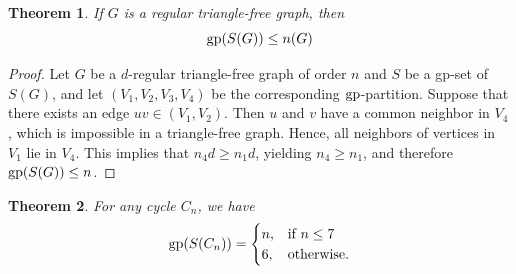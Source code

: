 \documentclass[a4paper,12pt]{article}
\newtheorem{theorem}{Theorem}[section]
\newcommand{\gp}{{\rm gp}}
\newcommand{\igp}{{\rm igp}}
\begin{document}
{%
\begin{theorem}\label{thm:regular bound}
		If $G$ is a regular triangle-free graph, then \[ \gp (S(G)) \leq n(G) \]
	\end{theorem} 
	\begin{proof}
		Let $G$ be a $d$-regular triangle-free graph of order $n$ and $S$ be a gp-set of $S(G)$, and let $(V_1,V_2,V_3,V_4)$ be the corresponding $\gp$-partition. Suppose that there exists an edge $uv \in (V_1,V_2)$. Then $u$ and $v$ have a common neighbor in $V_4$, which is impossible in a triangle-free graph. Hence, all neighbors of vertices in $V_1$ lie in $V_4$. This implies that $n_4 d \geq n_1 d$, yielding $n_4 \geq n_1$, and therefore $\gp(S(G)) \leq n$.

        \end{proof}
	\begin{theorem}
    For any cycle $C_n$, we have
    $$\gp(S(C_n))= \begin{cases}
        n, & \text{if } n\leq 7\\
        6, & \text{otherwise}.
    \end{cases}$$
    

\end{theorem}}
\end{document}
